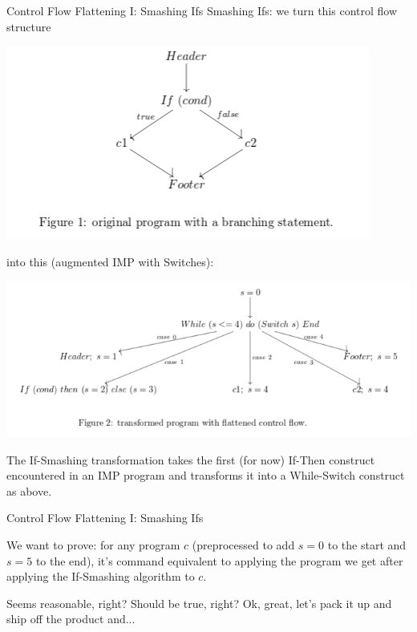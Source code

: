 \documentclass[10pt,handout]{beamer}
\theoremstyle{plain}
\theoremstyle{definition}
\begin{document}
\begin{frame}{Control Flow Flattening I: Smashing Ifs}
Smashing Ifs: we turn this control flow structure
\begin{center}
\includegraphics[scale=0.3]{IfSmash}
\end{center}
\pause \par \medskip
into this ({\color{red}augmented} IMP with Switches):
\begin{center}
\includegraphics[scale=0.3]{IfSmash2}
\end{center}
The If-Smashing transformation takes the first (for now) If-Then construct encountered in an IMP program and transforms it into a While-Switch construct as above. 
\end{frame}

\begin{frame}{Control Flow Flattening I: Smashing Ifs}

 We want to prove: for any program $c$ (preprocessed to add $s=0$ to the start and $s=5$ to the end), it's command equivalent to applying the program we get after applying the If-Smashing algorithm to $c$.
\par\pause\medskip

Seems reasonable, right?  Should be true, right?  Ok, great, let's pack it up and ship off the product and...


\end{frame}
\end{document}
